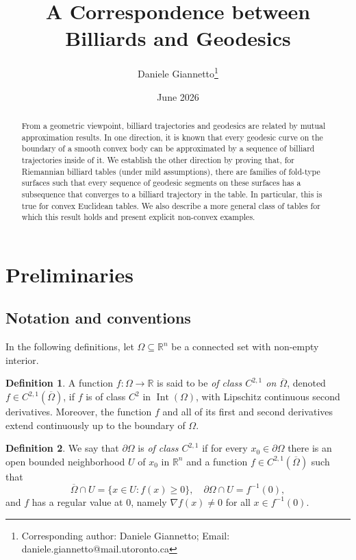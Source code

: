 \documentclass[11pt]{article}
\title{A Correspondence between Billiards and Geodesics}
\author{Daniele Giannetto\footnote{Corresponding author: Daniele Giannetto; Email: daniele.giannetto@mail.utoronto.ca}}
\date{June 2026}
\theoremstyle{definition}
\newtheorem{definition}{Definition}[section]
\theoremstyle{remark}
\theoremstyle{plain}
\DeclareMathOperator{\Int}{Int}
\newcommand{\R}{\mathbb{R}}
\begin{document}
\maketitle

\begin{abstract}
From a geometric viewpoint, billiard trajectories and geodesics are related by mutual approximation results. In one direction, it is known that every geodesic curve on the boundary of a smooth convex body can be approximated by a sequence of billiard trajectories inside of it. We establish the other direction by proving that, for Riemannian billiard tables (under mild assumptions), there are families of fold-type surfaces such that every sequence of geodesic segments on these surfaces has a subsequence that converges to a billiard trajectory in the table. In particular, this is true for convex Euclidean tables. We also describe a more general class of tables for which this result holds and present explicit non-convex examples.
\end{abstract}

\tableofcontents



\section{Preliminaries}

\subsection{Notation and conventions}

In the following definitions, let $\Omega\subseteq \R^n$ be a connected set with non-empty interior.

\begin{definition}

A function $f:\Omega\to \R$ is said to be \emph{of class $C^{2,1}$ on $\overline \Omega$}, denoted $f\in C^{2,1}(\overline \Omega)$, if $f$ is of class $C^2$ in $\Int(\Omega)$, with Lipschitz continuous second derivatives. Moreover, the function $f$ and all of its first and second derivatives extend continuously up to the boundary of $\Omega$. 

\end{definition}

\begin{definition}

We say that $\partial \Omega$ is \textit{of class $C^{2,1}$} if for every $x_0\in \partial \Omega$ there is an open bounded neighborhood $U$ of $x_0$ in $\R^n$ and a function $f\in C^{2,1}(\overline \Omega)$ such that
$$\overline{\Omega}\cap U = \{x\in U: f(x)\ge 0\}, \quad \partial \Omega \cap U = f^{-1}(0),$$
and $f$ has a regular value at $0$, namely $\nabla f(x) \neq 0$ for all $x\in f^{-1}(0)$.

\end{definition}
\end{document}
